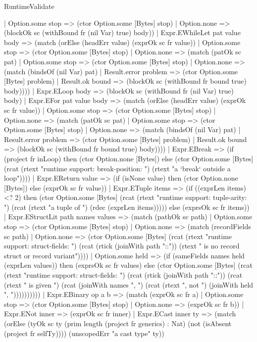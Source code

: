 \begin{lexlean}{RuntimeValidate}
\begin{semanticmodule}
{      | Option.some stop => (ctor Option.some [Bytes] stop)
      | Option.none => (blockOk sc (withBound fr (nil Var) true) body))
    | Expr.EWhileLet pat value body => (match (orElse (headErr value) (exprOk sc fr value))
      | Option.some stop => (ctor Option.some [Bytes] stop)
      | Option.none => (match (patOk sc pat)
        | Option.some stop => (ctor Option.some [Bytes] stop)
        | Option.none => (match (bindsOf (nil Var) pat)
          | Result.error problem => (ctor Option.some [Bytes] problem)
          | Result.ok bound => (blockOk sc (withBound fr bound true) body))))
    | Expr.ELoop body => (blockOk sc (withBound fr (nil Var) true) body)
    | Expr.EFor pat value body => (match (orElse (headErr value) (exprOk sc fr value))
      | Option.some stop => (ctor Option.some [Bytes] stop)
      | Option.none => (match (patOk sc pat)
        | Option.some stop => (ctor Option.some [Bytes] stop)
        | Option.none => (match (bindsOf (nil Var) pat)
          | Result.error problem => (ctor Option.some [Bytes] problem)
          | Result.ok bound => (blockOk sc (withBound fr bound true) body))))
    | Expr.EBreak => (if (project fr inLoop) then (ctor Option.none [Bytes]) else (ctor Option.some [Bytes] (rcat (rtext "runtime support: break-position: ") (rtext "a `break` outside a loop"))))
    | Expr.EReturn value => (if (isNone value) then (ctor Option.none [Bytes]) else (exprOk sc fr value))
    | Expr.ETuple items => (if ((exprLen items) <? 2) then (ctor Option.some [Bytes] (rcat (rtext "runtime support: tuple-arity: ") (rcat (rtext "a tuple of ") (rdec (exprLen items))))) else (exprsOk sc fr items))
    | Expr.EStructLit path names values => (match (pathOk sc path)
      | Option.some stop => (ctor Option.some [Bytes] stop)
      | Option.none => (match (recordFields sc path)
        | Option.none => (ctor Option.some [Bytes] (rcat (rtext "runtime support: struct-fields: ") (rcat (rtick (joinWith path "::")) (rtext " is no record struct or record variant"))))
        | Option.some held => (if (sameFields names held (exprLen values)) then (exprsOk sc fr values) else (ctor Option.some [Bytes] (rcat (rtext "runtime support: struct-fields: ") (rcat (rtick (joinWith path "::")) (rcat (rtext " is given ") (rcat (joinWith names ", ") (rcat (rtext ", not ") (joinWith held ", "))))))))))
    | Expr.EBinary op a b => (match (exprOk sc fr a)
      | Option.some stop => (ctor Option.some [Bytes] stop)
      | Option.none => (exprOk sc fr b))
    | Expr.ENot inner => (exprOk sc fr inner)
    | Expr.ECast inner ty => (match (orElse (tyOk sc ty (prim length (project fr generics) : Nat) (not (isAbsent (project fr selfTy)))) (unscopedErr "a cast type" ty))
}
\end{semanticmodule}
\end{lexlean}
